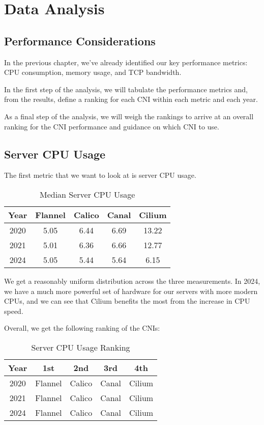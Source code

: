%
%

\pagebreak
\section{Data Analysis}

\onehalfspacing

\subsection{Performance Considerations}

In the previous chapter, we've already identified our key performance metrics: CPU consumption, memory usage, and TCP bandwidth. 

In the first step of the analysis, we will tabulate the performance metrics and, from the results, define a ranking for each CNI within each metric and each year.

As a final step of the analysis, we will weigh the rankings to arrive at an overall ranking for the CNI performance and guidance on which CNI to use.

\subsection{Server CPU Usage}

The first metric that we want to look at is server CPU usage.

\begin{table}[H]
\caption{Median Server CPU Usage}
\begin{tabular}{|c | c | c | c | c|} 
 \hline
 Year & Flannel & Calico & Canal & Cilium \\
 \hline\hline
 2020 & 5.05 & 6.44 & 6.69 & 13.22 \\ 
 \hline
 2021 & 5.01 & 6.36 & 6.66 & 12.77 \\
 \hline
 2024 & 5.05 & 5.44 & 5.64 & 6.15 \\
 \hline
\end{tabular}
\label{tab:cpu}
\end{table}

We get a reasonably uniform distribution across the three measurements. In 2024, we have a much more powerful set of hardware for our servers with more modern CPUs, and we can see that Cilium benefits the most from the increase in CPU speed.

Overall, we get the following ranking of the CNIs:

\begin{table}[H]
\caption{Server CPU Usage Ranking}
\begin{tabular}{|c | c | c | c | c|} 
 \hline
 Year & 1st & 2nd & 3rd & 4th \\
 \hline\hline
 2020 & Flannel & Calico & Canal & Cilium \\ 
 \hline
 2021 & Flannel & Calico & Canal & Cilium \\
 \hline
 2024 & Flannel & Calico & Canal & Cilium \\
 \hline
\end{tabular}
\label{tab:cpu-r}
\end{table}

